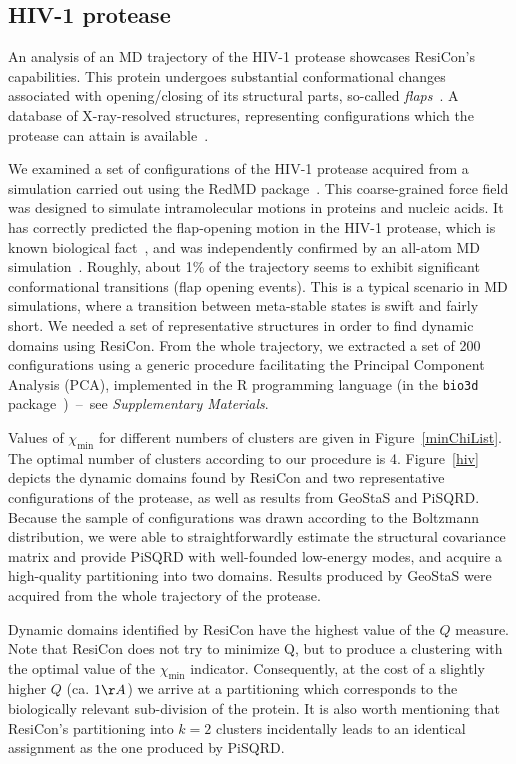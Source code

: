 \documentclass[a4paper,11pt,twoside]{book}%
\begin{document}
\subsection*{HIV-1 protease}
An analysis of an MD trajectory of the HIV-1 protease showcases ResiCon's capabilities.
This protein undergoes substantial conformational changes associated with opening/closing of its structural parts, so-called \emph{flaps}~\cite{hamelberg2005fast}.
A database of X-ray-resolved structures, representing configurations which the protease can attain is available~\cite{vondrasek2002hivdb}.

We examined a set of configurations of the HIV-1 protease acquired from a simulation carried out using the RedMD package~\cite{gorecki2009redmd}.
This coarse-grained force field was designed to simulate intramolecular motions in proteins and nucleic acids.
It has correctly predicted the flap-opening motion in the HIV-1 protease, which is known biological fact~\cite{hamelberg2005fast}, and was independently confirmed by an all-atom MD simulation~\cite{sadiq2010explicit}.
Roughly, about 1\% of the trajectory seems to exhibit significant conformational transitions (flap opening events).
This is a typical scenario in MD simulations, where a transition between meta-stable states is swift and fairly short.
We needed a set of representative structures in order to find dynamic domains using ResiCon.
From the whole trajectory, we extracted a set of 200 configurations using a generic procedure facilitating the Principal Component Analysis (PCA), implemented in the R programming language (in the \texttt{bio3d} package~\cite{grant2006bio3d})~--~see \emph{Supplementary Materials}.

Values of $\chi_\text{min}$ for different numbers of clusters are given in Figure~\ref{minChiList}.
The optimal number of clusters according to our procedure is 4.
Figure~\ref{hiv} depicts the dynamic domains found by ResiCon and two representative configurations of the protease, as well as results from GeoStaS and PiSQRD.
Because the sample of configurations was drawn according to the Boltzmann distribution, we were able to straightforwardly estimate the structural covariance matrix and provide PiSQRD with well-founded low-energy modes, and acquire a high-quality partitioning into two domains.
Results produced by GeoStaS were acquired from the whole trajectory of the protease.

Dynamic domains identified by ResiCon have the highest value of the $Q$ measure.
Note that ResiCon does not try to minimize Q, but to produce a clustering with the optimal value of the $\chi_\text{min}$ indicator.
Consequently, at the cost of a slightly higher $Q$ (ca. $1\AA$) we arrive at a partitioning which corresponds to the biologically relevant sub-division of the protein.
It is also worth mentioning that ResiCon's partitioning into $k=2$ clusters incidentally leads to an identical assignment as the one produced by PiSQRD.
\end{document}
